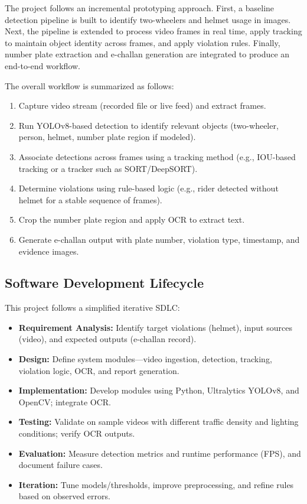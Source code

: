 The project follows an incremental prototyping approach. First, a baseline detection pipeline is built to identify two-wheelers and helmet usage in images. Next, the pipeline is extended to process video frames in real time, apply tracking to maintain object identity across frames, and apply violation rules. Finally, number plate extraction and e-challan generation are integrated to produce an end-to-end workflow.

The overall workflow is summarized as follows:
\begin{enumerate}[leftmargin=*]
  \item Capture video stream (recorded file or live feed) and extract frames.
  \item Run YOLOv8-based detection to identify relevant objects (two-wheeler, person, helmet, number plate region if modeled).
  \item Associate detections across frames using a tracking method (e.g., IOU-based tracking or a tracker such as SORT/DeepSORT).
  \item Determine violations using rule-based logic (e.g., rider detected without helmet for a stable sequence of frames).
  \item Crop the number plate region and apply OCR to extract text.
  \item Generate e-challan output with plate number, violation type, timestamp, and evidence images.
\end{enumerate}

\subsection{Software Development Lifecycle}
This project follows a simplified iterative SDLC:
\begin{itemize}[leftmargin=*]
  \item \textbf{Requirement Analysis:} Identify target violations (helmet), input sources (video), and expected outputs (e-challan record).
  \item \textbf{Design:} Define system modules---video ingestion, detection, tracking, violation logic, OCR, and report generation.
  \item \textbf{Implementation:} Develop modules using Python, Ultralytics YOLOv8, and OpenCV; integrate OCR.
  \item \textbf{Testing:} Validate on sample videos with different traffic density and lighting conditions; verify OCR outputs.
  \item \textbf{Evaluation:} Measure detection metrics and runtime performance (FPS), and document failure cases.
  \item \textbf{Iteration:} Tune models/thresholds, improve preprocessing, and refine rules based on observed errors.
\end{itemize}

